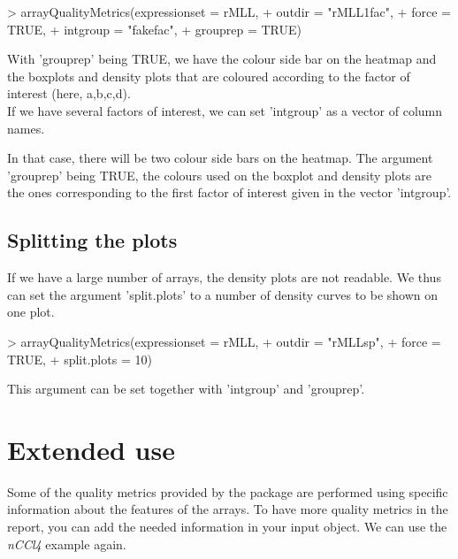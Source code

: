 \documentclass[a4paper]{article}
\begin{document}
%
\begin{Schunk}
\begin{Sinput}
> arrayQualityMetrics(expressionset = rMLL,
+                     outdir = "rMLL1fac",
+                     force = TRUE,
+                     intgroup = "fakefac",
+                     grouprep = TRUE)
\end{Sinput}
\end{Schunk}
%
With 'grouprep' being TRUE, we have the colour side bar on the heatmap and the boxplots and density plots that are coloured according to the factor of interest (here, a,b,c,d).
\\
If we have several factors of interest, we can set 'intgroup' as a vector of column names.
%
\begin{Schunk}
\end{Schunk}
%
In that case, there will be two colour side bars on the heatmap. The argument 'grouprep' being TRUE, the colours used on the boxplot and density plots are the ones corresponding to the first factor of interest given in the vector 'intgroup'.

\subsection{Splitting the plots}
If we have a large number of arrays, the density plots are not readable. We thus can set the argument 'split.plots' to a number of density curves to be shown on one plot.

%
\begin{Schunk}
\begin{Sinput}
> arrayQualityMetrics(expressionset = rMLL,
+                     outdir = "rMLLsp",
+                     force = TRUE,
+                     split.plots = 10)
\end{Sinput}
\end{Schunk}
%
This argument can be set together with 'intgroup' and 'grouprep'.

\section{Extended use}
\label{ext}
Some of the quality metrics provided by the package are performed using specific information about the features of the arrays.
To have more quality metrics in the report, you can add the needed information in your input object.
We can use the \emph{nCCl4} example again.
\end{document}
